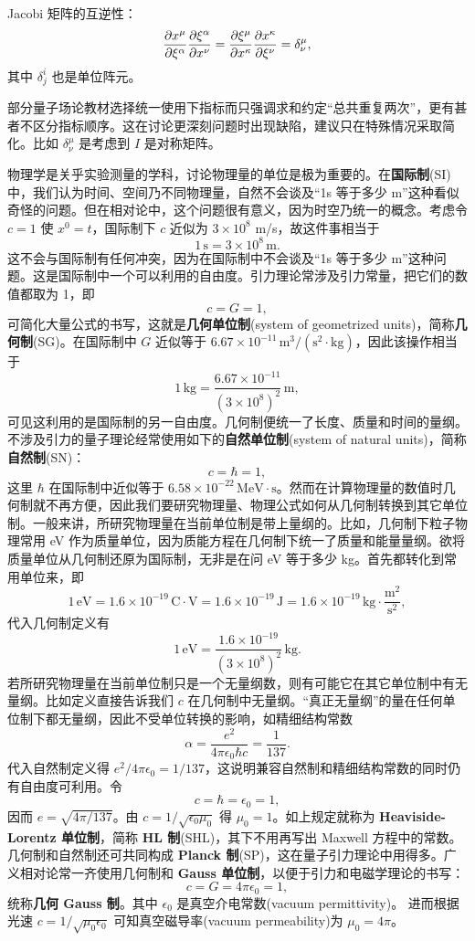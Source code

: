 Jacobi 矩阵的互逆性：
\[\pdv{x^\mu}{\xi^\alpha}\pdv{\xi^\alpha}{x^\nu}=\pdv{\xi^\mu}{x^\kappa} \pdv{x^\kappa}{\xi^\nu}=\delta^\mu_\nu,\]
其中 $\delta^i_j$ 也是单位阵元。

部分量子场论教材选择统一使用下指标而只强调求和约定“总共重复两次”，更有甚者不区分指标顺序。这在讨论更深刻问题时出现缺陷，建议只在特殊情况采取简化。比如 $\delta^\mu_\nu$ 是考虑到 $I$ 是对称矩阵。

物理学是关乎实验测量的学科，讨论物理量的单位是极为重要的。在\textbf{国际制}(SI)中，我们认为时间、空间乃不同物理量，自然不会谈及“1s 等于多少 m”这种看似奇怪的问题。但在相对论中，这个问题很有意义，因为时空乃统一的概念。考虑令 $c=1$ 使 $x^0=t$，国际制下 $c$ 近似为 $3\times 10^8$ m/s，故这件事相当于
\[
1\,\mathrm s=3\times 10^8\,\mathrm m.
\]
这不会与国际制有任何冲突，因为在国际制中不会谈及“1s 等于多少 m”这种问题。这是国际制中一个可以利用的自由度。引力理论常涉及引力常量，把它们的数值都取为 1，即
\[
c=G=1,
\]
可简化大量公式的书写，这就是\textbf{几何单位制}(system of geometrized units)，简称\textbf{几何制}(SG)。在国际制中 $G$ 近似等于 $6.67\times 10^{-11}\,\mathrm{m}^3/(\mathrm{s}^2\cdot\mathrm{kg})$，因此该操作相当于
\[
1\,\mathrm{kg}=\frac{6.67\times 10^{-11}}{(3\times 10^8)^2} \,\mathrm{m},
\]
可见这利用的是国际制的另一自由度。几何制便统一了长度、质量和时间的量纲。不涉及引力的量子理论经常使用如下的\textbf{自然单位制}(system of natural units)，简称\textbf{自然制}(SN)：
\[
c=\hbar=1,
\]
这里 $\hbar$ 在国际制中近似等于 $6.58\times 10^{-22}\,\mathrm{MeV}\cdot\mathrm s$。然而在计算物理量的数值时几何制就不再方便，因此我们要研究物理量、物理公式如何从几何制转换到其它单位制。一般来讲，所研究物理量在当前单位制是带上量纲的。比如，几何制下粒子物理常用 eV 作为质量单位，因为质能方程在几何制下统一了质量和能量量纲。欲将质量单位从几何制还原为国际制，无非是在问 eV 等于多少 kg。首先都转化到常用单位来，即
\[
1\,\mathrm{eV}=1.6 \times 10^{-19}\,\mathrm{C}\cdot\mathrm{V}=1.6\times 10^{-19}\,\mathrm{J}=1.6\times 10^{-19}\,\mathrm{kg}\cdot\frac{\mathrm{m}^2}{\mathrm{s}^2},
\]
代入几何制定义有
\[
1\,\mathrm{eV}=\frac{1.6\times 10^{-19}}{(3\times 10^8)^2}\,\mathrm{kg}.
\]
若所研究物理量在当前单位制只是一个无量纲数，则有可能它在其它单位制中有无量纲。比如定义直接告诉我们 $c$ 在几何制中无量纲。“真正无量纲”的量在任何单位制下都无量纲，因此不受单位转换的影响，如精细结构常数
\[
\alpha=\frac{e^2}{4\pi\epsilon_0\hbar c}=\frac{1}{137}.
\]
代入自然制定义得 $e^2/{4\pi\epsilon_0}=1/137$，这说明兼容自然制和精细结构常数的同时仍有自由度可利用。令
\[
c=\hbar=\epsilon_0=1,
\]
因而 $e=\sqrt{4\pi/137}$。由 $c=1/\sqrt{\epsilon_0\mu_0}$ 得 $\mu_0=1$。如上规定就称为 \textbf{Heaviside-Lorentz 单位制}，简称 \textbf{HL 制}(SHL)，其下不用再写出 Maxwell 方程中的常数。几何制和自然制还可共同构成 \textbf{Planck 制}(SP)，这在量子引力理论中用得多。广义相对论常一齐使用几何制和 \textbf{Gauss 单位制}，以便于引力和电磁学理论的书写：
\[
c=G=4\pi\epsilon_0=1,
\]
统称\textbf{几何 Gauss 制}。其中 $\epsilon_{0}$ 是真空介电常数(vacuum permittivity)。
进而根据光速 $c=1/\sqrt{\mu_0\epsilon_0}$ 可知真空磁导率(vacuum permeability)为 $\mu_{0}=4\pi$。 

